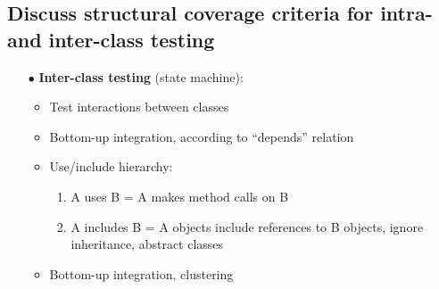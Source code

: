 \documentclass{article}
\begin{document}
\subsection{Discuss structural coverage criteria for intra- and inter-class testing}
\vspace{-0.5cm}
\begin{multicols}{2}
\begin{itemize}
    \item [$\bullet$]\textbf{Inter-class testing} (state machine):
    \begin{itemize}
        \item  Test interactions between classes
        \item Bottom-up integration, according to “depends”
relation
        \item Use/include hierarchy:
        \begin{enumerate}
            \item A uses B = A makes method calls on B
            \item A includes B = A objects include references to B objects, ignore inheritance, abstract
classes
        \end{enumerate}
        \item Bottom-up integration, clustering\\
    \end{itemize}
    

\end{itemize}
\end{multicols}
\end{document}
